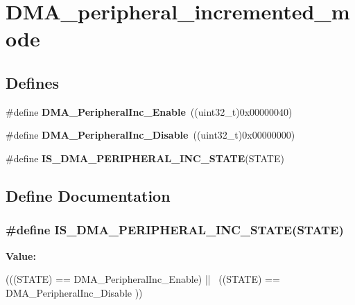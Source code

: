 \hypertarget{group__DMA__peripheral__incremented__mode}{
\section{DMA\_\-peripheral\_\-incremented\_\-mode}
\label{group__DMA__peripheral__incremented__mode}
}
\subsection*{Defines}
\begin{DoxyCompactItemize}
\item 
\hypertarget{group__DMA__peripheral__incremented__mode_gaf7921ea423fb60701a091c508cd0f33a}{
\#define {\bfseries DMA\_\-PeripheralInc\_\-Enable}~((uint32\_\-t)0x00000040)}
\label{group__DMA__peripheral__incremented__mode_gaf7921ea423fb60701a091c508cd0f33a}

\item 
\hypertarget{group__DMA__peripheral__incremented__mode_ga0fe3ff9c67bec802dd239fd17c3dbd31}{
\#define {\bfseries DMA\_\-PeripheralInc\_\-Disable}~((uint32\_\-t)0x00000000)}
\label{group__DMA__peripheral__incremented__mode_ga0fe3ff9c67bec802dd239fd17c3dbd31}

\item 
\#define {\bfseries IS\_\-DMA\_\-PERIPHERAL\_\-INC\_\-STATE}(STATE)
\end{DoxyCompactItemize}


\subsection{Define Documentation}
\hypertarget{group__DMA__peripheral__incremented__mode_ga28762105b3f567c16ba79a47e68ff0fa}{
\subsubsection[{IS\_\-DMA\_\-PERIPHERAL\_\-INC\_\-STATE}]{\setlength{\rightskip}{0pt plus 5cm}\#define IS\_\-DMA\_\-PERIPHERAL\_\-INC\_\-STATE(STATE)}}
\label{group__DMA__peripheral__incremented__mode_ga28762105b3f567c16ba79a47e68ff0fa}
{\bfseries Value:}
\begin{DoxyCode}
(((STATE) == DMA_PeripheralInc_Enable) || \
                                            ((STATE) == DMA_PeripheralInc_Disable
      ))
\end{DoxyCode}
